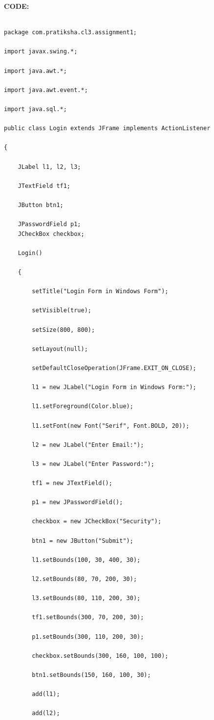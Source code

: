 \documentclass[a4paper,12pt]{article}
\begin{document}
\textbf{CODE:}
\begin{verbatim}
 
package com.pratiksha.cl3.assignment1;

import javax.swing.*;

import java.awt.*;

import java.awt.event.*;

import java.sql.*;

public class Login extends JFrame implements ActionListener

{

	JLabel l1, l2, l3;

	JTextField tf1;

	JButton btn1;

	JPasswordField p1;
	JCheckBox checkbox;

	Login()

	{

		setTitle("Login Form in Windows Form");

		setVisible(true);

		setSize(800, 800);

		setLayout(null);

		setDefaultCloseOperation(JFrame.EXIT_ON_CLOSE);

		l1 = new JLabel("Login Form in Windows Form:");

		l1.setForeground(Color.blue);

		l1.setFont(new Font("Serif", Font.BOLD, 20));

		l2 = new JLabel("Enter Email:");

		l3 = new JLabel("Enter Password:");

		tf1 = new JTextField();

		p1 = new JPasswordField();

		checkbox = new JCheckBox("Security");

		btn1 = new JButton("Submit");

		l1.setBounds(100, 30, 400, 30);

		l2.setBounds(80, 70, 200, 30);

		l3.setBounds(80, 110, 200, 30);

		tf1.setBounds(300, 70, 200, 30);

		p1.setBounds(300, 110, 200, 30);
		
		checkbox.setBounds(300, 160, 100, 100);

		btn1.setBounds(150, 160, 100, 30);

		add(l1);

		add(l2);


\end{verbatim}
\end{document}

